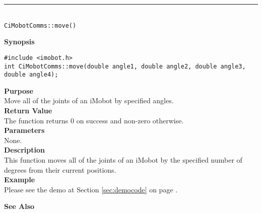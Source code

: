 \noindent
\vspace{5pt}
\rule{4.5in}{0.015in}\\
\noindent
{\LARGE \texttt{CiMobotComms::move()}}\\
{}

\noindent
{\bf Synopsis}\\
\begin{verbatim}
#include <imobot.h>
int CiMobotComms::move(double angle1, double angle2, double angle3, double angle4);
\end{verbatim}

\noindent
{\bf Purpose}\\
Move all of the joints of an iMobot by specified angles.\\

\noindent
{\bf Return Value}\\
The function returns 0 on success and non-zero otherwise.\\

\noindent
{\bf Parameters}\\
None.\\

\noindent
{\bf Description}\\
This function moves all of the joints of an iMobot by the specified number of degrees
from their current positions. \\

\noindent
{\bf Example}\\
Please see the demo at Section \ref{sec:democode} on page \pageref{sec:democode}.\\
\noindent

\noindent
{\bf See Also}\\

